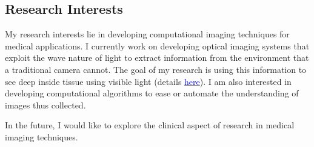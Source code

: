 \documentclass[margin,line]{res}
\begin{document}

\begin{resume}



\section{\sc Research Interests}
My research interests lie in developing computational imaging techniques for medical applications. I currently work on developing optical imaging systems that exploit the wave nature of light to extract information from the environment that a traditional camera cannot. The goal of my research is using this information to see deep inside tissue using visible light (details \href{http://seebelowtheskin.rice.edu/}{\textcolor{blue}{here}}). I am also interested in developing computational algorithms to ease or automate the understanding of images thus collected.

\vspace*{-0.1in}

In the future, I would like to explore the clinical aspect of research in medical imaging techniques. 

\vspace*{-0.13in}


\end{resume}
\end{document}
